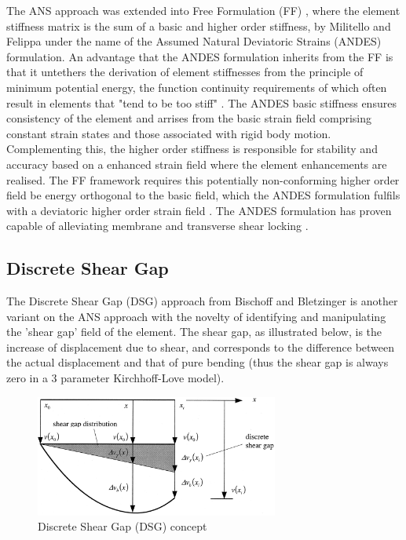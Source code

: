 The ANS approach was extended into Free Formulation (FF) \cite{Bergan84}, where the element stiffness matrix is the sum of a basic and higher order stiffness, by Militello and Felippa \cite{FELIPPA1990} under the name of the Assumed Natural Deviatoric Strains (ANDES) formulation. An advantage that the ANDES formulation inherits from the FF is that it untethers the derivation of element stiffnesses from the principle of minimum potential energy, the function continuity requirements of which often result in elements that "tend to be too stiff" \cite{Bergan84}. The ANDES basic stiffness ensures consistency of the element and arrises from the basic strain field comprising constant strain states and those associated with rigid body motion. Complementing this, the higher order stiffness is responsible for stability and accuracy \cite{Felippa2003} based on a enhanced strain field where the element enhancements are realised. The FF framework requires this potentially non-conforming higher order field be energy orthogonal to the basic field, which the ANDES formulation fulfils with a deviatoric higher order strain field \cite{felippa2002fitting}.  The ANDES formulation has proven capable of alleviating membrane and transverse shear locking \cite{Mostafa11}.

\subsection{Discrete Shear Gap}
\label{DSGbackground}

The Discrete Shear Gap (DSG) approach from Bischoff and Bletzinger \cite{Ble00} \cite{Bis04} is another variant on the ANS approach with the novelty of identifying and manipulating the 'shear gap' field of the element. The shear gap, as illustrated below, is the increase of displacement due to shear, and corresponds to the difference between the actual displacement and that of pure bending (thus the shear gap is always zero in a 3 parameter Kirchhoff-Love model).

\begin{figure}[H]
	\centering
	\def\svgwidth{\columnwidth}
	\includegraphics[width=8cm]{images/DSG.png}
	\caption{Discrete Shear Gap (DSG) concept \cite{Ble00}}
	\label{ansexample}
\end{figure}


